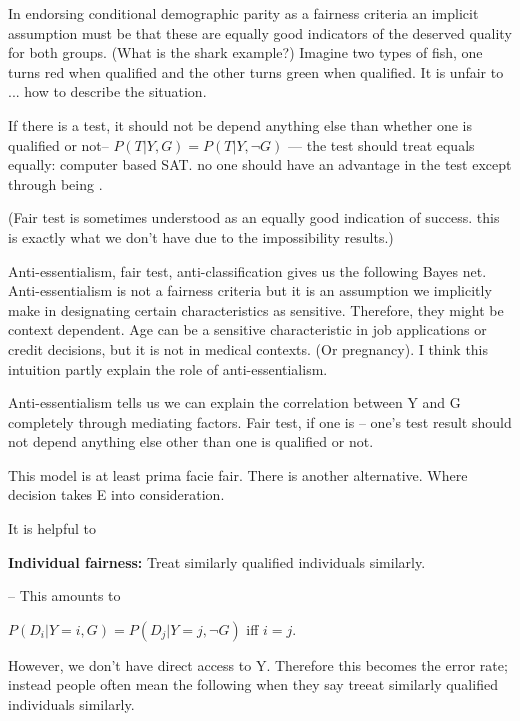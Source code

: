 \documentclass{article}
\begin{document}
In endorsing conditional demographic parity as a fairness criteria an implicit assumption must be that these are equally good indicators of the deserved quality for both groups. (What is the shark example?) Imagine two types of fish, one turns red when qualified and the other turns green when qualified. It is unfair to ... how to describe the situation. 


If there is a test, it should not be depend anything else than whether one is qualified or not-- $ P(T|Y, G) =  P(T|Y, \neg G)$ --- the test should treat equals equally: computer based SAT. no one should have an advantage in the test except through being . 

(Fair test is sometimes understood as an equally good indication of success. this is exactly what we don't have due to the impossibility results.)

Anti-essentialism, fair test, anti-classification gives us the following Bayes net. Anti-essentialism is not a fairness criteria but it is an assumption we implicitly make in designating certain characteristics as sensitive. Therefore, they might be context dependent. Age can be a sensitive characteristic in job applications or credit decisions, but it is not in medical contexts. (Or pregnancy). I think this intuition partly explain the role of anti-essentialism.

Anti-essentialism tells us we can explain the correlation between Y and G completely through mediating factors. Fair test, if one is -- one's test result should not depend anything else other than one is qualified or not. 

This model is at least prima facie fair. There is another alternative. Where decision takes E into consideration. 


It is helpful to 
    

\textbf{Individual fairness:} Treat similarly qualified individuals similarly. 

-- This amounts to 

$P(D_i|Y=i, G) = P(D_j|Y=j, \neg G)$ iff $i=j$. 

However, we don't have direct access to Y. Therefore this becomes the error rate; instead people often mean the following when they say treeat similarly qualified individuals similarly. 
\end{document}
